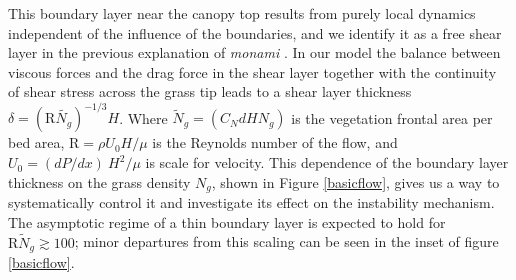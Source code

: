 \documentclass[aps,prl,twocolumn,superscriptaddress,10pt]{revtex4-1}  %
\newcommand{\Rey}{\text{R}}
\newcommand{\Ndg}{\tilde{N}_g}
\newcommand{\monami}{\textit{monami }}
\begin{document}
This boundary layer near the canopy top results from purely local dynamics independent of the influence of the boundaries, and we identify it as a free shear layer\cite{Ghisal02} in the previous explanation of \monami. 
In our model the balance between viscous forces and the drag force in the shear layer 
together with the continuity of shear stress across the grass tip 
 leads to a shear layer thickness $\delta=(\Rey\tilde{N_g})^{-1/3}H$.
Where $\Ndg = \left(C_N d H N_g\right)$ is the vegetation frontal area per bed area, $\Rey=\rho U_0 H/\mu$ is the Reynolds number of the flow, and $U_0 = {(dP/dx)~H^2}/{\mu}$ is scale for velocity. 
This dependence of the boundary layer thickness on the grass density $N_g$, shown in Figure \ref{basicflow}, gives us a way to systematically control it and investigate its effect on the instability mechanism.
The asymptotic regime of a thin boundary layer is expected to hold for $\Rey \Ndg \gtrsim 100$; minor departures from this scaling can be seen in the inset of figure \ref{basicflow}.
\end{document}
